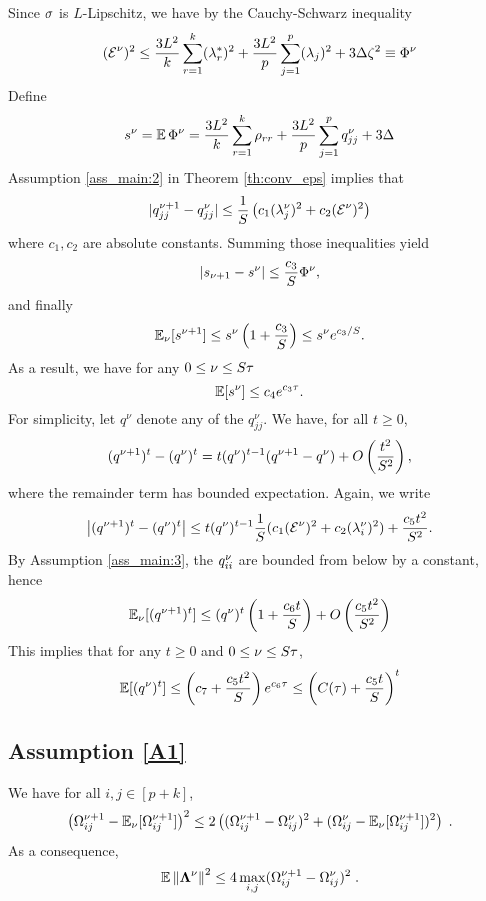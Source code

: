 Since $\sigma$ is $L$-Lipschitz, we have by the Cauchy-Schwarz inequality
\begin{equation}\label{eq:app:bound_error}
(\operatorname{{\cal E}}^\nu)^2 \leq \frac {3L^2} {k} \sum_{r=1}^k (\lambda_r^*)^2 + \frac {3L^2} {p} \sum_{j=1}^p (\lambda_j)^2 + 3\Delta \zeta^2 \equiv \Phi^\nu
\end{equation}
Define
\[ s^\nu = \operatorname{\mathbb{E}}\Phi ^\nu =  \frac {3L^2} {k} \sum_{r=1}^k \rho_{rr} + \frac {3L^2} {p} \sum_{j=1}^p q_{jj}^\nu + 3\Delta\]
Assumption \ref{ass_main:2} in Theorem \ref{th:conv_eps} implies that
\[ |q_{jj}^{\nu+1} - q_{jj}^\nu| \leq \frac 1 S \left(c_1 (\lambda_j^\nu)^2 + c_2 (\operatorname{{\cal E}}^\nu)^2 \right) \]
where $c_1, c_2$ are absolute constants. Summing those inequalities yield
\[ |s_{\nu+1} - s^{\nu}| \leq \frac{c_3}S \Phi^\nu,  \]
and finally
\[ \operatorname{\mathbb{E}}_\nu[s^{\nu+1}] \leq s^\nu \left(1 + \frac{c_3}{S}\right) \leq s^\nu e^{c_3/S}. \]
As a result, we have for any $0 \leq \nu \leq S \tau$
\begin{equation} 
\operatorname{\mathbb{E}}[s^\nu] \leq c_4 e^{c_3 \tau}.
\end{equation}
For simplicity, let $q^\nu$ denote any of the $q_{jj}^\nu$. We have, for all $t \geq 0$, 
\[ (q^{\nu+1})^t - (q^{\nu})^t = t (q^{\nu})^{t-1} (q^{\nu+1} - q^\nu) + O\left(\frac{t^2}{S^2}\right), \]
where the remainder term has bounded expectation. Again, we write
\[ \left|(q^{\nu+1})^t - (q^{\nu})^t \right| \leq t (q^{\nu})^{t-1} \frac1S(c_1 (\operatorname{{\cal E}}^\nu)^2 + c_2 (\lambda^\nu_i)^2) + \frac{c_5 t^2}{S^2}. \]
By Assumption \ref{ass_main:3}, the $q_{ii}^\nu$ are bounded from below by a constant, hence
\[ \operatorname{\mathbb{E}}_\nu[(q^{\nu+1})^t] \leq  (q^{\nu})^t \left(1 + \frac{c_6 t}{S} \right) + O\left(\frac{c_5 t^2}{S^2}\right)  \]
This implies that for any $t \geq 0$ and $0 \leq \nu \leq S\tau$,
\begin{equation}\label{eq:bound_q_powers}
    \operatorname{\mathbb{E}}[(q^{\nu})^t] \leq \left(c_7 + \frac{c_5t^2}{S}\right)e^{c_6 \tau} \leq \left(C(\tau) + \frac{c_5 t}{S}\right)^t
\end{equation}

\subsection{Assumption \ref{A1}}

We have for all $i, j \in [p+k]$,
\begin{equation}
    \nonumber
   \left(\Omega_{ij}^{\nu+1} - \operatorname{\mathbb{E}}_\nu [\Omega_{ij}^{\nu+1}]\right)^2 \leq 2\left((\Omega_{ij}^{\nu+1} - \Omega_{ij}^{\nu})^2 + (\Omega_{ij}^{\nu} - \operatorname{\mathbb{E}}_\nu[\Omega_{ij}^{\nu+1}])^2\right) \;.
\end{equation}
As a consequence,
\begin{equation}
    \nonumber
  \operatorname{\mathbb{E}} \norm{ \bm{\Lambda}^\nu }^{2} \leq 4 \max_{i,j} (\Omega_{ij}^{\nu+1} - \Omega_{ij}^{\nu})^2 \;.
\end{equation}

